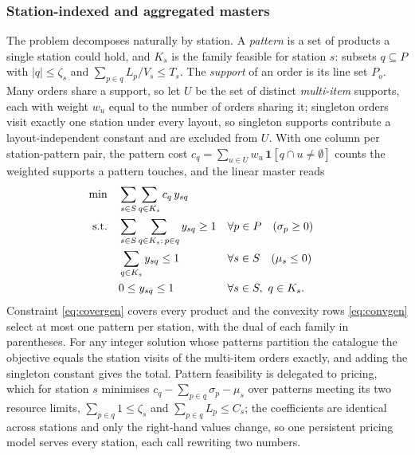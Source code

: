 \documentclass[]{interact}
\begin{document}
\subsubsection{Station-indexed and aggregated masters}\label{sec:cgmaster}
The problem decomposes naturally by station. A \emph{pattern} is a set of products a single station could hold, and $K_s$ is the family feasible for station $s$: subsets $q \subseteq P$ with $|q| \le \zeta_s$ and $\sum_{p \in q} L_p / V_s \le T_s$. The \emph{support} of an order is its line set $P_o$. Many orders share a support, so let $U$ be the set of distinct \emph{multi-item} supports, each with weight $w_u$ equal to the number of orders sharing it; singleton orders visit exactly one station under every layout, so singleton supports contribute a layout-independent constant and are excluded from $U$. With one column per station-pattern pair, the pattern cost $c_q = \sum_{u \in U} w_u\,\mathbf{1}[q \cap u \neq \emptyset]$ counts the weighted supports a pattern touches, and the linear master reads
\begin{align}
\min \quad & \sum_{s \in S} \sum_{q \in K_s} c_q\, y_{sq} \notag\\
\text{s.t.} \quad
& \sum_{s \in S} \sum_{q \in K_s:\, p \in q} y_{sq} \ge 1 && \forall p \in P \quad (\sigma_p \ge 0) \label{eq:covergen}\\
& \sum_{q \in K_s} y_{sq} \le 1 && \forall s \in S \quad (\mu_s \le 0) \label{eq:convgen}\\
& 0 \le y_{sq} \le 1 && \forall s \in S,\ q \in K_s. \notag
\end{align}
Constraint \eqref{eq:covergen} covers every product and the convexity rows \eqref{eq:convgen} select at most one pattern per station, with the dual of each family in parentheses. For any integer solution whose patterns partition the catalogue the objective equals the station visits of the multi-item orders exactly, and adding the singleton constant gives the total. Pattern feasibility is delegated to pricing, which for station $s$ minimises $c_q - \sum_{p \in q} \sigma_p - \mu_s$ over patterns meeting its two resource limits, $\sum_{p \in q} 1 \le \zeta_s$ and $\sum_{p \in q} L_p \le C_s$; the coefficients are identical across stations and only the right-hand values change, so one persistent pricing model serves every station, each call rewriting two numbers.
\end{document}
